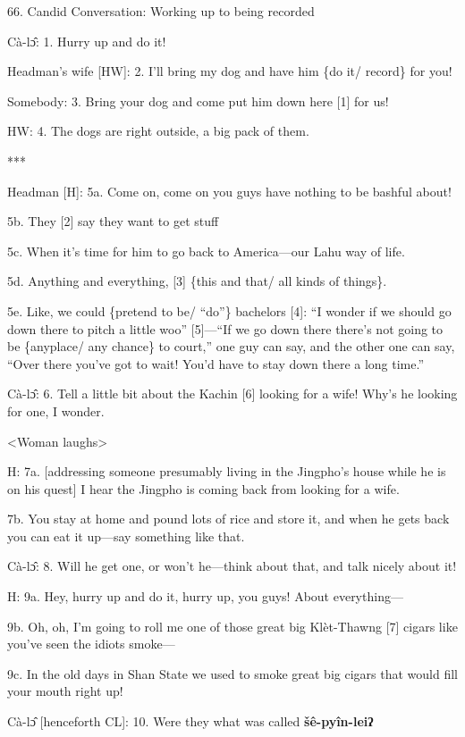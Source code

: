 
66. Candid Conversation: Working up to being recorded

Cà-lɔ̂: 1. Hurry up and do it!

Headman's wife [HW]: 2. I'll bring my dog and have him \{do it/ record\} for you!

Somebody: 3. Bring your dog and come put him down here [1] for us!

HW: 4. The dogs are right outside, a big pack of them.

***

Headman [H]: 5a. Come on, come on you guys have nothing to be bashful about!

5b. They [2] say they want to get stuff

5c. When it's time for him to go back to America---our Lahu way of life.

5d. Anything and everything, [3] \{this and that/ all kinds of things\}.

5e. Like, we could \{pretend to be/ ``do''\} bachelors [4]: ``I wonder if we should
go down there to pitch a little woo'' [5]---``If we go down there there's not going
to be \{anyplace/ any chance\} to court,'' one guy can say, and the other one can
say, ``Over there you've got to wait! You'd have to stay down there a long time.''

Cà-lɔ̂: 6. Tell a little bit about the Kachin [6] looking for a wife!  Why's
he looking for one, I wonder.

<Woman laughs>

H: 7a. [addressing someone presumably living in the Jingpho's house while he is
on his quest] I hear the Jingpho is coming back from looking for a wife.

7b. You stay at home and pound lots of rice and store it, and when he gets back
you can eat it up---say something like that.

Cà-lɔ̂: 8. Will he get one, or won't he---think about that, and talk nicely
about it!

H: 9a. Hey, hurry up and do it, hurry up, you guys! About everything---

9b. Oh, oh, I'm going to roll me one of those great big Klèt-Thawng [7] cigars
like you've seen the idiots smoke---

9c. In the old days in Shan State we used to smoke great big cigars that would
fill your mouth right up!

Cà-lɔ̂ [henceforth CL]: 10. Were they what was called \textbf{šê-pyîn-leiʔ}
